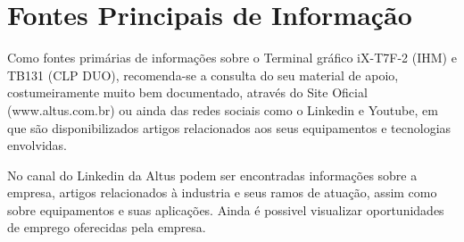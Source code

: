 \chapter{Fontes Principais de Informação}
\label{cap:trabalhos-relacionados}

Como fontes primárias de informações sobre o Terminal gráfico iX-T7F-2 (\acrshort{IHM}) e \acrshort{TB}131 (CLP DUO), 
recomenda-se a consulta do seu material de apoio, 
costumeiramente muito bem documentado, 
através do Site Oficial (www.altus.com.br) ou ainda das redes sociais como o Linkedin e Youtube,
em que são disponibilizados artigos relacionados aos seus equipamentos e tecnologias envolvidas. 


\begin{figure}[ht!]
	\centering
\end{figure}


No canal do Linkedin da Altus podem ser encontradas informações sobre a empresa, artigos relacionados à industria e seus ramos de atuação, assim como sobre equipamentos e suas aplicações. Ainda é possivel visualizar oportunidades de emprego oferecidas pela empresa.


\begin{figure}[ht!]
	\centering
\end{figure}


